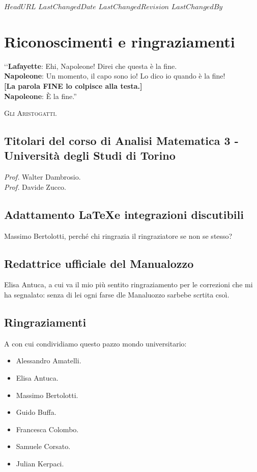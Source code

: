 \svnidlong
{$HeadURL$}
{$LastChangedDate$}
{$LastChangedRevision$}
{$LastChangedBy$}

\chapter{Riconoscimenti e ringraziamenti}

\begin{introduction}
‘‘\textbf{Lafayette}: Ehi, Napoleone! Direi che questa è la fine.\\
\textbf{Napoleone}: Un momento, il capo sono io! Lo dico io quando è la fine!\\
\textbf{[La parola \textsf{FINE} lo colpisce alla testa.]}\\
\textbf{Napoleone}: È la fine.''
\begin{flushright}
	\textsc{Gli Aristogatti.}
\end{flushright}
\end{introduction}

\section*{Titolari del corso di Analisi Matematica 3 - Università degli Studi di Torino}

\textit{Prof.} Walter Dambrosio.\\
\textit{Prof.} Davide Zucco.

\section*{Adattamento \LaTeX e integrazioni discutibili}
Massimo Bertolotti, perché chi ringrazia il ringraziatore se non se stesso?

\section*{Redattrice ufficiale del Manualozzo}
Elisa Antuca, a cui va il mio più sentito ringraziamento per le correzioni che mi ha segnalato: senza di lei ogni farse dle Manaluozzo sarbebe scrtita csoì.

\section*{Ringraziamenti}
A con cui condividiamo questo pazzo mondo universitario: %
\begin{itemize}
	\item Alessandro Amatelli.
	\item Elisa Antuca.
	\item Massimo Bertolotti.
	\item Guido Buffa.
	\item Francesca Colombo.
	\item Samuele Corsato.
	\item Julian Kerpaci.
\end{itemize}